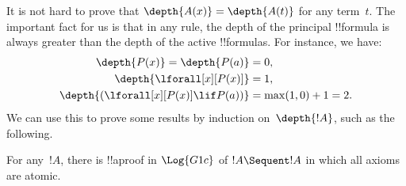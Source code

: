 \documentclass[../../../include/open-logic-section]{subfiles}
\begin{document}
It is not hard to prove that $\depth{A(x)} = \depth{A(t)}$ for any
term~$t$. The important fact for us is that in any rule, the depth of
the principal !!{formula} is always greater than the depth of the
active !!{formula}s. For instance, we have:
\begin{align*}
\depth{P(x)} = \depth{P(a)} & = 0,\\
\depth{\lforall[x][P(x)]} & = 1,\\
\depth{(\lforall[x][P(x)] \lif P(a))} & = \max(1,0) + 1 = 2.
\end{align*}
We can use this to prove some results by induction on~$\depth{!A}$,
such as the following.

\begin{prop}
For any~$!A$, there is !!a{proof} in $\Log{G1c}$ of $!A \Sequent !A$
in which all axioms are atomic.
\end{prop}
\end{document}
